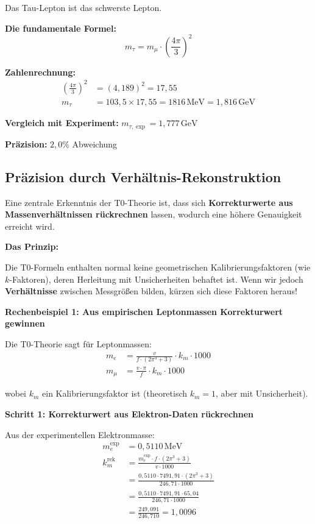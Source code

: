 	Das Tau-Lepton ist das schwerste Lepton.
	
	\textbf{Die fundamentale Formel:}
	\begin{equation}
		\boxed{m_\tau = m_\mu \cdot \left(\frac{4\pi}{3}\right)^2}
	\end{equation}
	
	\textbf{Zahlenrechnung:}
	\begin{align}
		\left(\frac{4\pi}{3}\right)^2 &= (4{,}189)^2 = 17{,}55 \\
		m_\tau &= 103{,}5 \times 17{,}55 = 1816\,\text{MeV} = 1{,}816\,\text{GeV}
	\end{align}
	
	\textbf{Vergleich mit Experiment:} \(m_{\tau,\exp} = 1{,}777\,\text{GeV}\)
	
	\textbf{Präzision:} \(2{,}0\%\) Abweichung
	
	\subsection{Präzision durch Verhältnis-Rekonstruktion}
	
	Eine zentrale Erkenntnis der T0-Theorie ist, dass sich \textbf{Korrekturwerte aus Massenverhältnissen rückrechnen} lassen, wodurch eine höhere Genauigkeit erreicht wird.
	
	\textbf{Das Prinzip:}
	
	Die T0-Formeln enthalten normal keine geometrischen Kalibrierungsfaktoren (wie \(k\)-Faktoren), deren Herleitung mit Unsicherheiten behaftet ist. Wenn wir jedoch \textbf{Verhältnisse} zwischen Messgrößen bilden, kürzen sich diese Faktoren heraus!
	
	\textbf{Rechenbeispiel 1: Aus empirischen Leptonmassen Korrekturwert gewinnen}
	
	Die T0-Theorie sagt für Leptonmassen:
	\begin{align}
		m_e &= \frac{v}{f \cdot (2\pi^3 + 3)} \cdot k_m \cdot 1000 \\
		m_\mu &= \frac{v \cdot \pi}{f} \cdot k_m \cdot 1000
	\end{align}
	
	wobei \(k_m\) ein Kalibrierungsfaktor ist (theoretisch \(k_m = 1\), aber mit Unsicherheit).
	
	\textbf{Schritt 1: Korrekturwert aus Elektron-Daten rückrechnen}
	
	Aus der experimentellen Elektronmasse:
	\begin{align}
		m_e^{\exp} &= 0{,}5110\,\text{MeV} \\
		k_m^{\text{rek}} &= \frac{m_e^{\exp} \cdot f \cdot (2\pi^3 + 3)}{v \cdot 1000} \\
		&= \frac{0{,}5110 \cdot 7491{,}91 \cdot (2\pi^3 + 3)}{246{,}71 \cdot 1000} \\
		&= \frac{0{,}5110 \cdot 7491{,}91 \cdot 65{,}04}{246{,}71 \cdot 1000} \\
		&= \frac{249{,}091}{246{,}710} = 1{,}0096
	\end{align}
	
